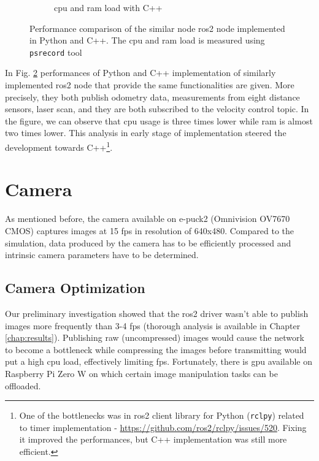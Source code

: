 \begin{figure}[H]
\begin{subfigure}{.8\textwidth}
  \caption{\ac{cpu} and \ac{ram} load with C++}
  \label{fig:physical:py_vs_cpp:cpp}
\end{subfigure}
\caption[Performance comparison of implementations in Python and C++]{Performance comparison of the similar node \ac{ros2} node implemented in Python and C++. The \ac{cpu} and \ac{ram} load is measured using \texttt{psrecord} tool}
\label{fig:physical:py_vs_cpp}
\end{figure}

In Fig. \ref{fig:physical:py_vs_cpp} performances of Python and C++ implementation of similarly implemented \ac{ros2} node that provide the same functionalities are given.
More precisely, they both publish odometry data, measurements from eight distance sensors, laser scan, and they are both subscribed to the velocity control topic.
In the figure, we can observe that \ac{cpu} usage is three times lower while \ac{ram} is almost two times lower.
This analysis in early stage of implementation steered the development towards C++\footnote{One of the bottlenecks was in \ac{ros2} client library for Python (\texttt{rclpy}) related to timer implementation - \url{https://github.com/ros2/rclpy/issues/520}. Fixing it improved the performances, but C++ implementation was still more efficient.}.


\section{Camera}
As mentioned before, the camera available on e-puck2 (Omnivision OV7670 CMOS) captures images at 15 \acs{fps} in resolution of 640x480.
Compared to the simulation, data produced by the camera has to be efficiently processed and intrinsic camera parameters have to be determined.

\subsection{Camera Optimization}
Our preliminary investigation showed that the \ac{ros2} driver wasn't able to publish images more frequently than 3-4 \acs{fps} (thorough analysis is available in Chapter \ref{chap:results}).
Publishing raw (uncompressed) images would cause the network to become a bottleneck while compressing the images before transmitting would put a high \ac{cpu} load, effectively limiting \ac{fps}.
Fortunately, there is \ac{gpu} available on Raspberry Pi Zero W on which certain image manipulation tasks can be offloaded.

